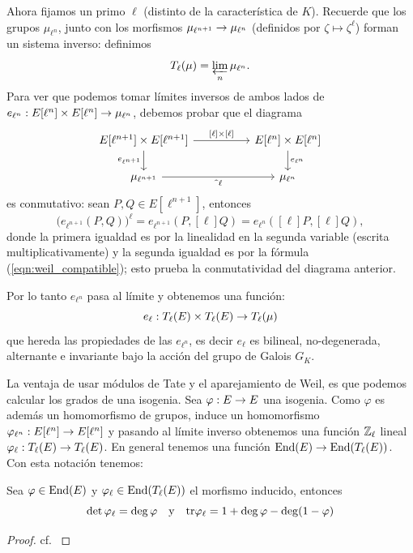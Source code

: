 Ahora fijamos un primo $\ell$ (distinto de la caracter\'istica de $K$). Recuerde que los grupos
$\mu_{\ell^n}$, junto con los morfismos $\mu_{\ell^{n+1}}\rightarrow\mu_{\ell^n}$ (definidos por
$\zeta\mapsto\zeta^{\ell}$) forman un sistema inverso: definimos
\[
  T_{\ell}(\mu)=\varprojlim_n \mu_{\ell^n}.
\]
Para ver que podemos tomar l\'imites inversos de ambos lados de
$e_{\ell^n}:E[\ell^n]\times E[\ell^n]\rightarrow\mu_{\ell^n}$, debemos probar que el diagrama
\[
  \begin{tikzcd}[column sep=50]
    E[\ell^{n+1}]\times E[\ell^{n+1}] \arrow[r,"\mathrm{[}\ell\mathrm{]}\times\mathrm{[}\ell\mathrm{]}"]
    \arrow[d,"e_{\ell^{n+1}}"'] &
    E[\ell^n]\times E[\ell^n] \arrow[d,"e_{\ell^n}"] \\
    \mu_{\ell^{n+1}} \arrow[r,"\text{\textasciicircum} \ell"'] & \mu_{\ell^n}
  \end{tikzcd}
\]
es conmutativo: sean $P,Q\in E[\ell^{n+1}]$, entonces
\[
  \big( e_{\ell^{n+1}}(P,Q) \big)^{\ell}=e_{\ell^{n+1}}(P,[\ell]Q)= e_{\ell^n}([\ell]P,[\ell]Q),
\]
donde la primera igualdad es por la linealidad en la segunda variable (escrita multiplicativamente)
y la segunda igualdad es por la f\'ormula (\ref{eqn:weil_compatible}); esto prueba la conmutatividad
del diagrama anterior.

Por lo tanto $e_{\ell^n}$ pasa al l\'imite y obtenemos una funci\'on:
\[
  e_{\ell}:T_{\ell}(E)\times T_{\ell}(E) \rightarrow T_{\ell}(\mu)
\]
que hereda las propiedades de las $e_{\ell^n}$, es decir $e_{\ell}$ es bilineal, no-degenerada,
alternante e invariante bajo la acci\'on del grupo de Galois $G_K$.

La ventaja de usar m\'odulos de Tate y el aparejamiento de Weil, es que podemos calcular los grados
de una isogenia. Sea $\varphi:E\rightarrow E$ una isogenia. Como $\varphi$ es adem\'as un homomorfismo de
grupos, induce un homomorfismo $\varphi_{\ell^n}:E[\ell^n]\rightarrow E[\ell^n]$ y pasando al l\'imite inverso
obtenemos una funci\'on $\mathbb{Z}_{\ell}$ lineal $\varphi_{\ell}:T_{\ell}(E)\rightarrow T_{\ell}(E)$. En general
tenemos una funci\'on $\mathrm{End}(E)\rightarrow\mathrm{End}(T_{\ell}(E))$. Con esta notaci\'on tenemos:

\begin{prop}\label{prop:detweil}
  Sea $\varphi\in\mathrm{End}(E)$ y $\varphi_{\ell}\in\mathrm{End}(T_{\ell}(E))$ el morfismo inducido, entonces
  \[
    \det\varphi_{\ell}=\deg\varphi \quad\mathrm{y}\quad
    \mathrm{tr}\varphi_{\ell}=1+\deg\varphi-\deg(1-\varphi)
  \]
\end{prop}

\begin{proof}
  cf. \cite[cap\'itulo III, \S8, proposici\'on 8.6]{SilvermanTAOEC}
\end{proof}



